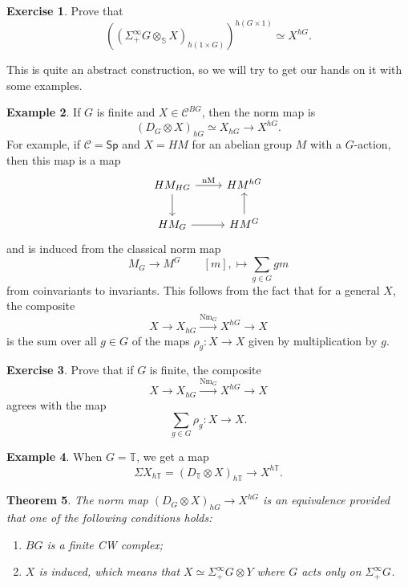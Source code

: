 \documentclass[10pt]{amsart}
\newtheorem{thm}{Theorem}[subsection]
\theoremstyle{definition}
\newtheorem{exm}[thm]{Example}
\newtheorem{exer}[thm]{Exercise}
\theoremstyle{remark}
\theoremstyle{plain}
\theoremstyle{definition}
\theoremstyle{remark}
\newcommand{\bS}{\mathbb{S}}
\newcommand{\mc}[1]{\mathcal{#1}}
\newcommand{\T}{\mathbb{T}}
\newcommand{\mr}[1]{\mathrm{#1}}
\newcommand{\ms}[1]{\mathsf{#1}}
\newcommand{\1}{\mathbf{1}}
\newcommand{\2}{\mathbf{2}}
\newcommand{\3}{\mathbf{3}}
\begin{document}
\begin{exer}
    Prove that
    \[ ((\Sigma_+^{\infty} G \otimes_{\bS} X)_{h(1 \times G)})^{h(G \times 1)} \simeq X^{hG}. \]
\end{exer}

This is quite an abstract construction, so we will try to get our hands on it with some examples.

\begin{exm}
    If $G$ is finite and $X \in \mc{C}^{BG}$, then the norm map is
    \[ (D_G \otimes X)_{hG} \simeq X_{hG} \to X^{hG}. \]
    For example, if $\mc{C} = \ms{Sp}$ and $X = HM$ for an abelian group $M$ with a $G$-action, then this map is a map
    \begin{equation*}
    \begin{tikzcd}
        HM_{HG} \ar{r}{\mr{nM}} \ar{d} & HM^{hG} \\
        H M_G \ar{r} & H M^G \ar{u}
    \end{tikzcd}
    \end{equation*}
    and is induced from the classical norm map
    \[ M_G \to M^G \qquad [m], \mapsto \sum_{g \in G} gm \]
    from coinvariants to invariants.
    This follows from the fact that for a general $X$, the composite
    \[ X \to X_{hG} \xrightarrow{\mr{Nm}_G} X^{hG} \to X \]
    is the sum over all $g \in G$ of the maps $\rho_g \colon X \to X$ given by multiplication by $g$.
\end{exm}

\begin{exer}
    Prove that if $G$ is finite, the composite
    \[ X \to X_{hG} \xrightarrow{\mr{Nm}_G} X^{hG} \to X \]
    agrees with the map
    \[ \sum_{g \in G} \rho_g \colon X \to X. \]
\end{exer}

\begin{exm}
    When $G = \T$, we get a map
    \[ \Sigma X_{h\T} = (D_{\T} \otimes X)_{h\T} \to X^{h\T}. \]
\end{exm}

\begin{thm}
    The norm map $(D_G \otimes X)_{hG} \to X^{hG}$ is an equivalence provided that one of the following conditions holds:
    \begin{enumerate}
        \item $BG$ is a finite CW complex;
        \item $X$ is induced, which means that $X \simeq \Sigma_+^{\infty} G \otimes Y$ where $G$ acts only on $\Sigma_+^{\infty} G$.
    \end{enumerate}
\end{thm}
\end{document}
